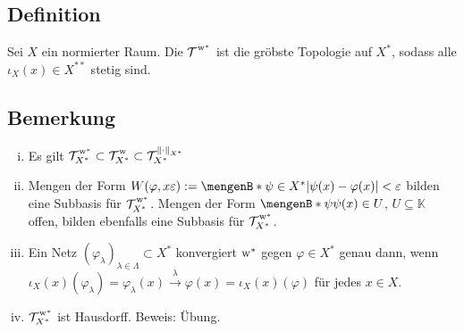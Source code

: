 \subsection[Definition: Die $\w^*$-Topologie auf $X^*$]{Definition} %
\label{sub:58}
Sei $X$ ein normierter Raum. Die  $\weakTstar{ }$ ist die gröbste Topologie auf $X^*$, sodass alle $\iota_X(x) \in X^{**}$ stetig sind.

\subsection[Bemerkungen zur $\w^*$-Topologie auf $X^*$]{Bemerkung} %
\label{sub:59}
\begin{enumerate}[(i)]
	\item Es gilt $\weakTstar{X^*} \subset \weakT{X^*} \subset \mathcal{T}^{\norm[X^*]{\cdot}}_{X^*}$
	\item Mengen der Form $W(\varphi,x \varepsilon) := \set[\psi \in X^*]{\abs*{\psi(x)- \varphi(x)}< \varepsilon}$ bilden eine Subbasis für $\weakTstar{X^*}$.
	Mengen der Form $\set[\psi]{ \psi(x) \in U}$, $U \subseteq \mathds{K}$ offen, bilden ebenfalls eine Subbasis für $\weakTstar{X^*}$.
	\item Ein Netz $(\varphi_\lambda)_{\lambda \in \Lambda} \subset X^*$ konvergiert $\w^*$ gegen $\varphi \in X^*$ genau dann, wenn 
	$\iota_X(x)(\varphi_\lambda)=\varphi_\lambda(x) \xrightarrow{\lambda} \varphi(x) = \iota_X(x)(\varphi)$ für jedes $x \in X$.
	\item $\weakTstar{X^*}$ ist Hausdorff. Beweis: Übung.
\end{enumerate}

